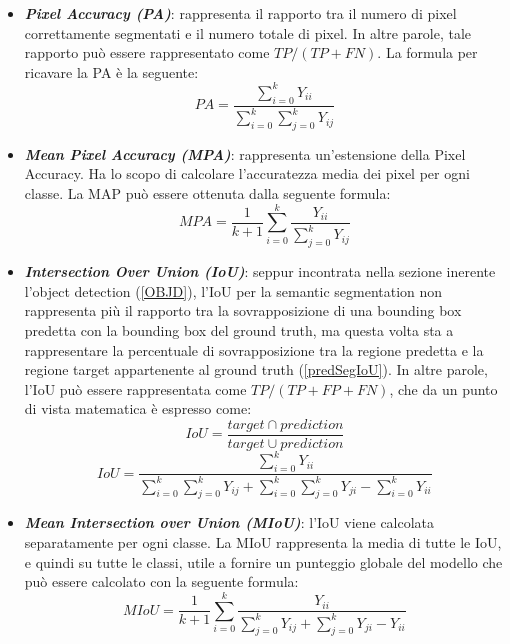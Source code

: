 \begin{itemize}
    \item {\bfseries{\emph{Pixel Accuracy (PA)}}}: rappresenta il rapporto tra il numero di pixel 
    correttamente segmentati e il numero totale di pixel. In altre parole, tale 
    rapporto può essere rappresentato come $TP/(TP+FN)$. La formula per 
    ricavare la PA è la seguente:
    \begin{equation}
        PA = \frac{\sum_{i=0}^kY_{ii}}{\sum_{i=0}^k\sum_{j=0}^kY_{ij}}
    \end{equation}

    \item {\bfseries{\emph{Mean Pixel Accuracy (MPA)}}}: rappresenta un'estensione della Pixel 
    Accuracy. Ha lo scopo di calcolare l'accuratezza media dei pixel per ogni 
    classe. La MAP può essere ottenuta dalla seguente formula:
    \begin{equation}
        MPA = \frac{1}{k+1}\sum_{i=0}^k\frac{Y_{ii}}{\sum_{j=0}^kY_{ij}}
    \end{equation}

    \item {\bfseries{\emph{Intersection Over Union (IoU)}}}: seppur incontrata nella sezione inerente 
    l'object detection (\ref{OBJD}), l'IoU per la semantic segmentation non rappresenta 
    più il rapporto tra la sovrapposizione di una bounding box predetta con 
    la bounding box del ground truth, ma questa volta sta a rappresentare la 
    percentuale di sovrapposizione tra la regione predetta e la regione target 
    appartenente al ground truth (\ref{predSegIoU}). In altre parole, l'IoU può essere rappresentata 
    come $TP/(TP+FP+FN)$, che da un punto di vista matematica è espresso come:
    \begin{equation}\label{predSegIoU}
        IoU = \frac{target\cap prediction}{target\cup prediction}
    \end{equation}
    \begin{equation}
        IoU = \frac{\sum_{i=0}^kY_{ii}}{\sum_{i=0}^k\sum_{j=0}^kY_{ij}+\sum_{i=0}^k\sum_{j=0}^kY_{ji}-\sum_{i=0}^kY_{ii}}
    \end{equation}

    \item {\bfseries{\emph{Mean Intersection over Union (MIoU)}}}: l'IoU viene calcolata separatamente 
    per ogni classe. La MIoU rappresenta la media di tutte le IoU, e 
    quindi su tutte le classi, utile a fornire un punteggio globale del modello che 
    può essere calcolato con la seguente formula:
    \begin{equation}
        MIoU = \frac{1}{k+1}\sum_{i=0}^k\frac{Y_{ii}}{\sum_{j=0}^kY_{ij}+\sum_{j=0}^kY_{ji}-Y_{ii}}
    \end{equation}


\end{itemize}
